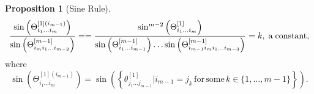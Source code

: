 \documentclass[fleqn,11pt,twoside]{article}
\theoremstyle{definition}
\newtheorem{prop}{Proposition}
\begin{document}
\begin{prop}[Sine Rule]
\begin{equation}\label{eq:81}
\frac{\sin\left(\Theta^{[1](i_{m-1})}_{i_1\dots i_{m}}\right)}{\sin\left(\Theta^{[m-1]}_{i_mi_1\dots i_{m-2}}\right)}==\frac{\sin^{m-2}\left(\Theta^{[1]}_{i_1\dots i_m}\right)}{\sin\left(\Theta^{[m-1]}_{i_1\dots i_{m-1}}\right)\dots\sin\left(\Theta^{[m-1]}_{i_{m-1}i_mi_1\dots i_{m-3}}\right)}=k,\;\textrm{a\;constant},
\end{equation}
where
\begin{equation}
\sin\left(\Theta^{[1](i_{m-1})}_{i_1 \dots i_m}\right)=\sin\left(\left\{\theta^{[1]}_{j_1\dots j_{m-1}}\bigg| i_{m-1}=j_k\, \mathrm{for\,some}\, k\in\{1,\dots,m-1\}\right\}\right).
\end{equation}

\end{prop}
\end{document}

